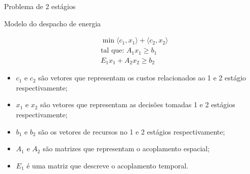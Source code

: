 \documentclass[12pt]{beamer}%
\begin{document}
\begin{frame}{Problema de 2 est\'agios}
	\begin{justify}	
	\begin{figure}[!h]
	 \centering
	 \label{estagio}
	\end{figure}
	\end{justify}
\end{frame}

\begin{frame}{Modelo do despacho de energia}
	\begin{justify}	
	\begin{align}
		&\min \langle c_1,x_1\rangle + \langle c_2,x_2\rangle \nonumber \\
		&\mbox{tal que: }	A_1 x_1 \geq b_1 \nonumber \\
		&E_1 x_1 + A_2 x_2 \geq b_2 \nonumber
	\end{align}
	\begin{itemize}
		\justifying
	  \item $c_1$ e $c_2$ s\~ao vetores que representam os custos relacionados ao 1 e 2 est\'agio respectivamente;
	  \item $x_1$ e $x_2$ s\~ao vetores que representam as decis\~oes tomadas 1 e 2 est\'agios respectivamente;
	  \item $b_1$ e $b_2$ s\~ao os vetores de recursos no 1 e 2 est\'agios respectivamente;
	  \item $A_1$ e $A_2$ s\~ao matrizes que representam o acoplamento espacial;
	  \item $E_1$ \'e uma matriz que descreve o acoplamento temporal.
	\end{itemize}
	\end{justify}
\end{frame}
\end{document}
